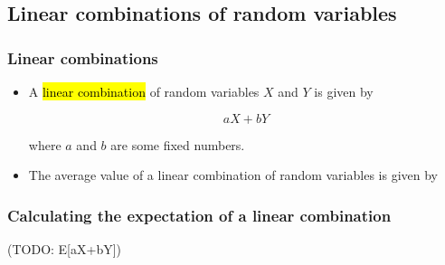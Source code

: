 \documentclass[slidestop,compress,mathserif]{beamer}
\newcommand{\soln}[1]{\textit{#1}}
\begin{document}

\subsection{Linear combinations of random variables}


\begin{frame}
\frametitle{Linear combinations}

\begin{itemize}

\item A \hl{linear combination} of random variables $X$ and $Y$ is given by

\[ aX + bY \]

where $a$ and $b$ are some fixed numbers.

\pause

\item The average value of a linear combination of random variables is given by
\formula{\[ E(aX + bY) = a \times E(X) + b \times E(Y) \]}

\end{itemize}

\end{frame}


\begin{frame}
\frametitle{Calculating the expectation of a linear combination}

(TODO: E[aX+bY])



\end{frame}

\end{document}
